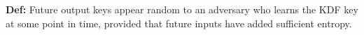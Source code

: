 \textbf{Def:} Future output keys appear random to an adversary who learns the KDF key at some point in time, provided that future inputs have added sufficient entropy.
